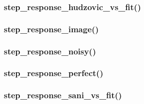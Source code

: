 \subsubsection{step\_response\_hudzovic\_vs\_fit()}


\subsubsection{step\_response\_image()}


\subsubsection{step\_response\_noisy()}


\subsubsection{step\_response\_perfect()}


\subsubsection{step\_response\_sani\_vs\_fit()}


